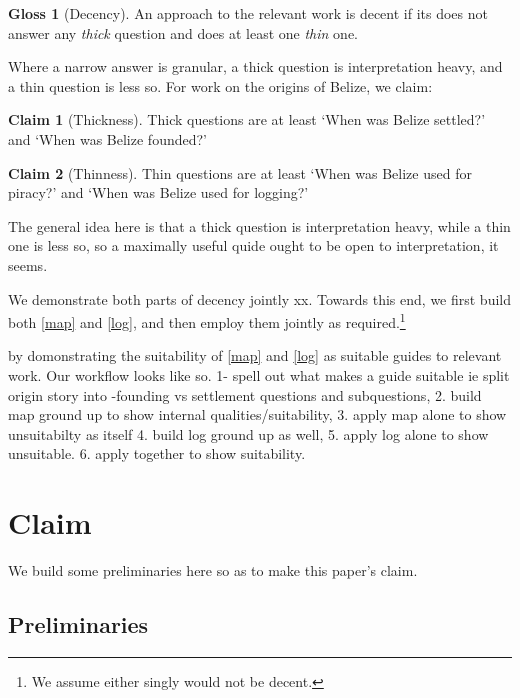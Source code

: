 \documentclass{amsart}
\newcommand{\mention}[1]{\textit{#1}}%
\theoremstyle{definition}%
\theoremstyle{definition}%
\newtheorem{claim}{Claim}
\theoremstyle{remark}%
\theoremstyle{definition}%
\theoremstyle{definition}%
\newtheorem{gloss}{Gloss}
\begin{document}
%
\begin{gloss}[Decency]
An approach to the relevant work is decent if its does not answer any \mention{thick} question and does at least one \mention{thin} one.%
\end{gloss}
%
Where a narrow answer is granular, a thick question is interpretation heavy, and a thin question is less so. For work on the origins of Belize, we claim:
%
\begin{claim}[Thickness]%
Thick questions are at least `When was Belize settled?' and `When was Belize founded?'
\end{claim}
%
\begin{claim}[Thinness]
Thin questions are at least `When was Belize used for piracy?' and `When was Belize used for logging?'
\end{claim}
%
The general idea here is that a thick question is interpretation heavy, while a thin one is less so, so a maximally useful quide ought to be open to interpretation, it seems.

We demonstrate both parts of decency jointly xx. %
Towards this end, we first build both \ref{map} and \ref{log}, and then employ them jointly as required.\footnote{We assume either singly would not be decent.}

by domonstrating the suitability of \ref{map} and \ref{log} as suitable guides to relevant work. Our workflow looks like so.
1- spell out what makes a guide suitable ie split origin story into -founding vs settlement questions and subquestions,
2. build map ground up to show internal qualities/suitability,
3. apply map alone to show unsuitabilty as itself
4. build log ground up as well,
5. apply log alone to show unsuitable.
6. apply together to show suitability.
%
%
%
%
\section{Claim}%
\label{s:claim}
We build some preliminaries here so as to make this paper's claim.
%
\subsection{Preliminaries}
\label{ss:prelims}
\end{document}
